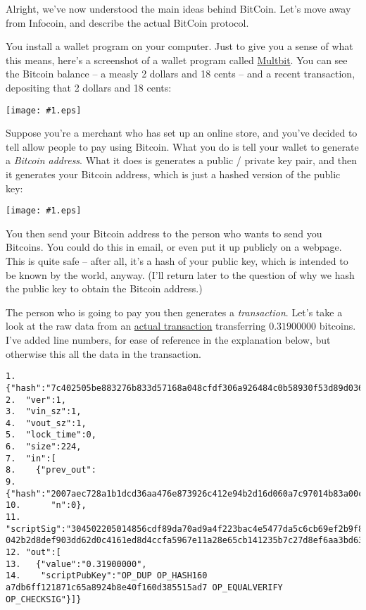 \documentclass[12pt]{book}
\newcommand{\img}[2]{\begin{center}\texttt{[image: \#1.eps]}\end{center}}
\newcommand{\link}[2]{\href{#1}{#2}}
\begin{document}
Alright, we've now understood the main ideas behind BitCoin.  Let's
move away from Infocoin, and describe the actual BitCoin protocol.

You install a wallet program on your computer.  Just to give you a
sense of what this means, here's a screenshot of a wallet program
called \link{XXX}{Multbit}.  You can see the Bitcoin balance -- a
measly 2 dollars and 18 cents -- and a recent transaction, depositing
that 2 dollars and 18 cents:
% 
\img{images/wallet_transaction}{400px}
%
Suppose you're a merchant who has set up an online store, and you've
decided to tell allow people to pay using Bitcoin.  What you do is
tell your wallet to generate a \emph{Bitcoin address}.  What it does
is generates a public / private key pair, and then it generates your
Bitcoin address, which is just a hashed version of the public key:
%
\img{images/bitcoin_address}{400px}
%
You then send your Bitcoin address to the person who wants to send you
Bitcoins.  You could do this in email, or even put it up publicly on a
webpage.  This is quite safe -- after all, it's a hash of your public
key, which is intended to be known by the world, anyway.  (I'll return
later to the question of why we hash the public key to obtain the
Bitcoin address.)

The person who is going to pay you then generates a
\emph{transaction}.  Let's take a look at the raw data from an
\link{http://blockexplorer.com/tx/7c402505be883276b833d57168a048cfdf306a926484c0b58930f53d89d036f9}{actual
  transaction} transferring $0.31900000$ bitcoins.  I've added line
numbers, for ease of reference in the explanation below, but otherwise
this all the data in the transaction.

\begin{verbatim} 
1.  {"hash":"7c402505be883276b833d57168a048cfdf306a926484c0b58930f53d89d036f9",
2.  "ver":1,
3.  "vin_sz":1,
4.  "vout_sz":1,
5.  "lock_time":0,
6.  "size":224,
7.  "in":[
8.    {"prev_out":
9.      {"hash":"2007aec728a1b1dcd36aa476e873926c412e94b2d16d060a7c97014b83a00c3e",
10.      "n":0},
11.    "scriptSig":"304502205014856cdf89da70ad9a4f223bac4e5477da5c6cb69ef2b9f8b5f8548e21307e0221009bfe2698f1eb1c561f41981d8e78c11d9e685a70e682f144ee6c8ab5ecb0497c01 042b2d8def903dd62d0c4161ed8d4ccfa5967e11a28e65cb141235b7c27d8ef6aa3bd63be077323cf3d7e0e8895b264b94feb4b40478b431da6f45dfc8e1004f62"}],
12. "out":[
13.   {"value":"0.31900000",
14.    "scriptPubKey":"OP_DUP OP_HASH160 a7db6ff121871c65a8924b8e40f160d385515ad7 OP_EQUALVERIFY OP_CHECKSIG"}]}
\end{verbatim}
\end{document}

